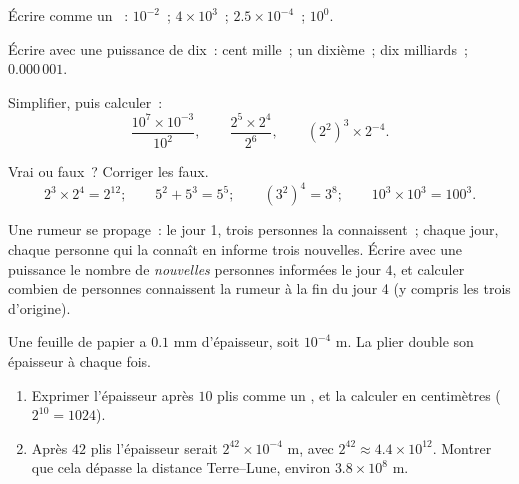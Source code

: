 \begin{exercise}[$\star$]\label{exo:g8:powers:4}
Écrire comme un ~: $10^{-2}$~; \quad $4 \times 10^3$~;
\quad $2.5 \times 10^{-4}$~; \quad $10^0$.
\end{exercise}

\begin{exercise}[$\star$]\label{exo:g8:powers:5}
Écrire avec une puissance de dix~: cent mille~; un dixième~; dix
milliards~; $0.000\,001$.
\end{exercise}

\begin{exercise}[$\star$]\label{exo:g8:powers:6}
Simplifier, puis calculer~:
\[
\frac{10^7 \times 10^{-3}}{10^2},
\qquad
\frac{2^5 \times 2^4}{2^6},
\qquad
\left(2^2\right)^3 \times 2^{-4} .
\]
\end{exercise}

\begin{exercise}[$\star$]\label{exo:g8:powers:7}
Vrai ou faux~? Corriger les faux.
\[
2^3 \times 2^4 = 2^{12}; \qquad
5^2 + 5^3 = 5^5; \qquad
(3^2)^4 = 3^8; \qquad
10^3 \times 10^3 = 100^3 .
\]
\end{exercise}

\begin{exercise}[$\star\star$]\label{exo:g8:powers:8}
Une rumeur se propage~: le jour 1, trois personnes la connaissent~;
chaque jour, chaque personne qui la connaît en informe trois
nouvelles. Écrire avec une puissance le nombre de \emph{nouvelles}
personnes informées le jour $4$, et calculer combien de personnes
connaissent la rumeur à la fin du jour 4 (y compris les trois
d'origine).
\end{exercise}

\begin{exercise}[$\star\star$]\label{exo:g8:powers:9}
Une feuille de papier a $0.1$ mm d'épaisseur, soit $10^{-4}$ m. La
plier double son épaisseur à chaque fois.
\begin{enumerate}
  \item Exprimer l'épaisseur après $10$ plis comme un , et la
        calculer en centimètres ($2^{10} = 1024$).
  \item Après $42$ plis l'épaisseur serait
        $2^{42} \times 10^{-4}$ m, avec $2^{42} \approx 4.4 \times
        10^{12}$. Montrer que cela dépasse la distance Terre--Lune,
        environ $3.8 \times 10^8$ m.
\end{enumerate}
\end{exercise}

